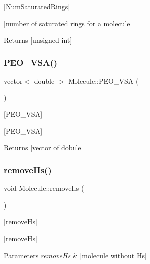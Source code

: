 \mbox{[}Num\+Saturated\+Rings\mbox{]} 

\mbox{[}number of saturated rings for a molecule\mbox{]}

\begin{DoxyReturn}{Returns}
\mbox{[}unsigned int\mbox{]} 
\end{DoxyReturn}
\mbox{\label{class_molecule_a7af6b3bc2840250b9e9aac63067a4b3d}} 
\subsubsection{\texorpdfstring{P\+E\+O\+\_\+\+V\+S\+A()}{PEO\_VSA()}}
{\footnotesize\ttfamily vector$<$ double $>$ Molecule\+::\+P\+E\+O\+\_\+\+V\+SA (\begin{DoxyParamCaption}{ }\end{DoxyParamCaption})}



\mbox{[}P\+E\+O\+\_\+\+V\+SA\mbox{]} 

\mbox{[}P\+E\+O\+\_\+\+V\+SA\mbox{]}

\begin{DoxyReturn}{Returns}
\mbox{[}vector of dobule\mbox{]} 
\end{DoxyReturn}
\mbox{\label{class_molecule_aff4e7702feb85eb5d43b5ae89a504ca3}} 
\subsubsection{\texorpdfstring{remove\+Hs()}{removeHs()}}
{\footnotesize\ttfamily void Molecule\+::remove\+Hs (\begin{DoxyParamCaption}{ }\end{DoxyParamCaption})}



\mbox{[}remove\+Hs\mbox{]} 

\mbox{[}remove\+Hs\mbox{]}


\begin{DoxyParams}{Parameters}
{\em remove\+Hs} & \mbox{[}molecule without Hs\mbox{]} \\
\hline
\end{DoxyParams}
\mbox{\label{class_molecule_a1d3b07d426af616e861606727848d35e}} 
